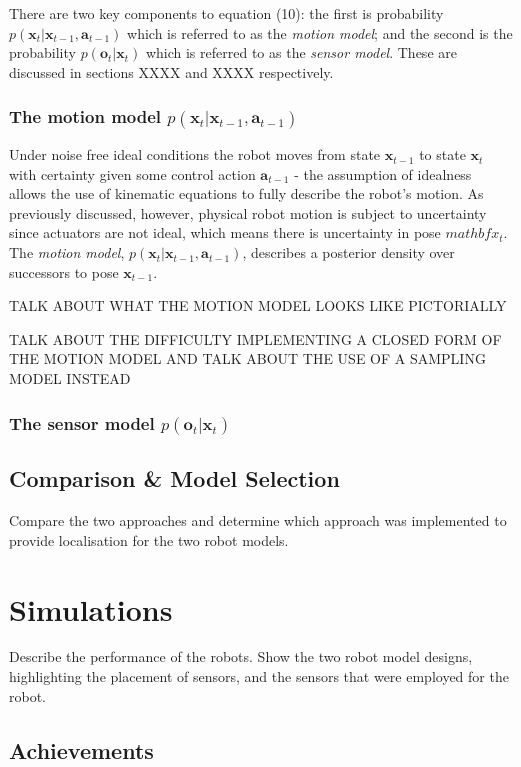 \documentclass[a4paper]{article}
\begin{document}
There are two key components to equation (10):  the first is probability $p(\mathbf{x}_t| \mathbf{x}_{t-1}, \mathbf{a}_{t-1})$ which is referred to as the \textit{motion model}; and the second is the probability $p(\mathbf{o}_t|\mathbf{x}_t)$ which is referred to as the \textit{sensor model}. These are discussed in sections XXXX and XXXX respectively.

\subsubsection{The motion model $p(\mathbf{x}_t| \mathbf{x}_{t-1}, \mathbf{a}_{t-1})$}
Under noise free ideal conditions the robot moves from state $\mathbf{x}_{t-1}$ to state $\mathbf{x}_t$ with certainty given some control action $\mathbf{a}_{t-1}$ - the assumption of idealness allows the use of kinematic equations to fully describe the robot's motion. As previously discussed, however, physical robot motion is subject to uncertainty since actuators are not ideal, which means there is uncertainty in pose $mathbf{x}_{t}$. The \textit{motion model}, $p(\mathbf{x}_t| \mathbf{x}_{t-1}, \mathbf{a}_{t-1})$, describes a posterior density over successors to pose $\mathbf{x}_{t-1}$.

TALK ABOUT WHAT THE MOTION MODEL LOOKS LIKE PICTORIALLY

TALK ABOUT THE DIFFICULTY IMPLEMENTING A CLOSED FORM OF THE MOTION MODEL AND TALK ABOUT THE USE OF A SAMPLING MODEL INSTEAD

\subsubsection{The sensor model $p(\mathbf{o}_t|\mathbf{x}_t)$}


\subsection{Comparison \& Model Selection}
Compare the two approaches and determine which approach was implemented to provide localisation for the two robot models.

\section{Simulations}
Describe the performance of the robots. Show the two robot model designs, highlighting the placement of sensors, and the sensors that were employed for the robot.

\subsection{Achievements}
\end{document}
